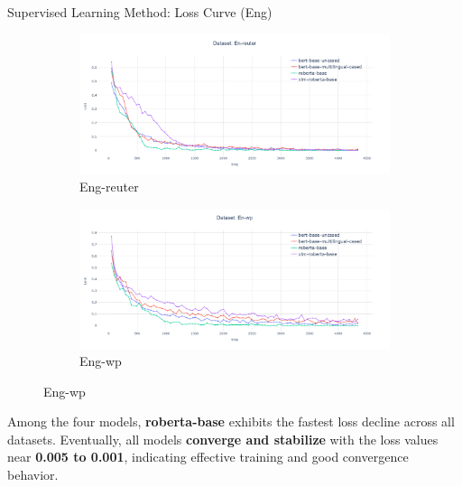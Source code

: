 \documentclass[serif]{beamer}
\begin{document}
\begin{frame}{Supervised Learning Method: Loss Curve (Eng)}
\begin{figure}[htbp]
    \begin{subfigure}[b]{0.44\linewidth}
        \centering
        \includegraphics[width=\linewidth]{images/en_reuter.png}
        \caption{Eng-reuter}
        \label{fig:en-reuter}
    \end{subfigure}
    \hfill
    \begin{subfigure}[b]{0.44\linewidth}
        \centering
        \includegraphics[width=\linewidth]{images/en_wp.png}
        \caption{Eng-wp}
        \label{fig:en-wp}
    \end{subfigure}

    \label{fig:four-plots}
    \vspace{-1em}  %
\end{figure}
\footnotesize
Among the four models, \textbf{roberta-base} exhibits the fastest loss decline across all datasets. Eventually, all models \textbf{converge and stabilize} with the loss values near \textbf{0.005 to 0.001}, indicating effective training and good convergence behavior.

\end{frame}
\end{document}
